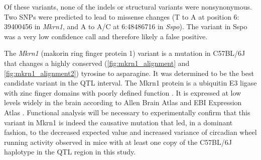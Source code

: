     Of these variants, none of the indels or structural variants were nonsynonymous.
    Two SNPs were predicted to lead to missense changes (T to A at position 6: 39400456 in \textit{Mkrn1}, and A to A/C at 6:48486716 in \textit{Sspo}).
    The variant in Sspo was a very low confidence call and therefore likely a false positive.

    The \textit{Mkrn1} (makorin ring finger protein 1) variant is a mutation in C57BL/6J that changes a highly conserved (\autoref{fig:mkrn1_alignment} and \autoref{fig:mkrn1_alignment2}) tyrosine to asparagine.
    It was determined to be the best candidate variant in the QTL interval.
    The Mkrn1 protein is a ubiquitin E3 ligase with zinc finger domains with poorly defined function \citep{Kim2005a}.
    It is expressed at low levels widely in the brain according to Allen Brain Atlas and EBI Expression Atlas \citep{Kapushesky2009,McWilliam2013,AllenInstituteforBrainScience2015,McWilliam2013}.
    Functional analysis will be necessary to experimentally confirm that this variant in Mkrn1 is indeed the causative mutation that led, in a dominant fashion, to the decreased expected value and increased variance of circadian wheel running activity observed in mice with at least one copy of the C57BL/6J haplotype in the QTL region in this study.


